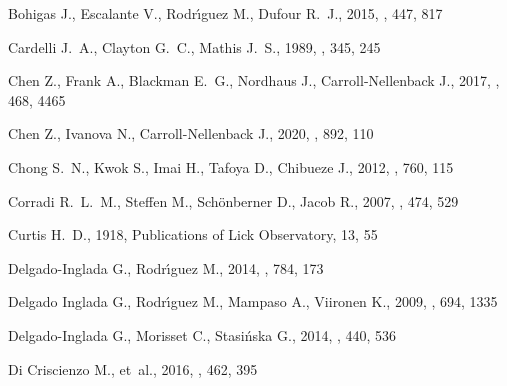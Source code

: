\documentclass[useAMS, usenatbib]{mnras}
\begin{document}
\begin{thebibliography}{}
{Bohigas} J.,  {Escalante} V.,  {Rodr{\'{\i}}guez} M.,   {Dufour} R.~J.,  2015,
  \mnras, 447, 817

{Cardelli} J.~A.,  {Clayton} G.~C.,   {Mathis} J.~S.,  1989, \apj, 345, 245

{Chen} Z.,  {Frank} A.,  {Blackman} E.~G.,  {Nordhaus} J.,
  {Carroll-Nellenback} J.,  2017, \mnras, 468, 4465

{Chen} Z.,  {Ivanova} N.,   {Carroll-Nellenback} J.,  2020, \apj, 892, 110

{Chong} S.~N.,  {Kwok} S.,  {Imai} H.,  {Tafoya} D.,   {Chibueze} J.,  2012,
  \apj, 760, 115

{Corradi} R.~L.~M.,  {Steffen} M.,  {Schönberner} D.,   {Jacob} R.,  2007,
  \aap, 474, 529

{Curtis} H.~D.,  1918, Publications of Lick Observatory, 13, 55

{Delgado-Inglada} G.,  {Rodr{\'{\i}}guez} M.,  2014, \apj, 784, 173

{Delgado Inglada} G.,  {Rodr{\'{\i}}guez} M.,  {Mampaso} A.,   {Viironen} K.,
  2009, \apj, 694, 1335

{Delgado-Inglada} G.,  {Morisset} C.,   {Stasińska} G.,  2014, \mnras, 440,
  536

{Di Criscienzo} M.,  et~al., 2016, \mnras, 462, 395


\end{thebibliography}
\end{document}
